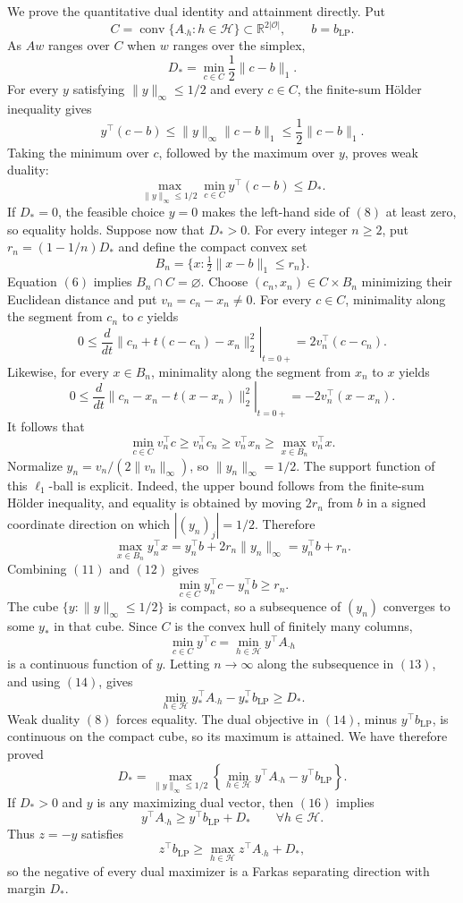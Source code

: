 We prove the quantitative dual identity and attainment directly. Put
\[
C=\operatorname{conv}\{A_{\cdot h}:h\in\mathcal H\}\subset\mathbb R^{2|\mathcal O|},\qquad b=b_{\mathrm{LP}}.
\]
As \(Aw\) ranges over \(C\) when \(w\) ranges over the simplex,
\[
D_*=\min_{c\in C}\frac12\lVert c-b\rVert_1.
\tag{6}
\]
For every \(y\) satisfying \(\lVert y\rVert_\infty\le1/2\) and every \(c\in C\), the finite-sum H\"older inequality gives
\[
y^\top(c-b)\le\lVert y\rVert_\infty\lVert c-b\rVert_1\le\frac12\lVert c-b\rVert_1.
\tag{7}
\]
Taking the minimum over \(c\), followed by the maximum over \(y\), proves weak duality:
\[
\max_{\lVert y\rVert_\infty\le1/2}\min_{c\in C}y^\top(c-b)\le D_*.
\tag{8}
\]
If \(D_*=0\), the feasible choice \(y=0\) makes the left-hand side of \((8)\) at least zero, so equality holds. Suppose now that \(D_*>0\). For every integer \(n\ge2\), put \(r_n=(1-1/n)D_*\) and define the compact convex set
\[
B_n=\{x:\tfrac12\lVert x-b\rVert_1\le r_n\}.
\]
Equation \((6)\) implies \(B_n\cap C=\varnothing\). Choose \((c_n,x_n)\in C\times B_n\) minimizing their Euclidean distance and put \(v_n=c_n-x_n\ne0\). For every \(c\in C\), minimality along the segment from \(c_n\) to \(c\) yields
\[
0\le\left.\frac{d}{dt}\lVert c_n+t(c-c_n)-x_n\rVert_2^2\right|_{t=0+}=2v_n^\top(c-c_n).
\tag{9}
\]
Likewise, for every \(x\in B_n\), minimality along the segment from \(x_n\) to \(x\) yields
\[
0\le\left.\frac{d}{dt}\lVert c_n-x_n-t(x-x_n)\rVert_2^2\right|_{t=0+}=-2v_n^\top(x-x_n).
\tag{10}
\]
It follows that
\[
\min_{c\in C}v_n^\top c\ge v_n^\top c_n\ge v_n^\top x_n\ge\max_{x\in B_n}v_n^\top x.
\tag{11}
\]
Normalize \(y_n=v_n/(2\lVert v_n\rVert_\infty)\), so \(\lVert y_n\rVert_\infty=1/2\). The support function of this \(\ell_1\)-ball is explicit. Indeed, the upper bound follows from the finite-sum H\"older inequality, and equality is obtained by moving \(2r_n\) from \(b\) in a signed coordinate direction on which \(|(y_n)_j|=1/2\). Therefore
\[
\max_{x\in B_n}y_n^\top x=y_n^\top b+2r_n\lVert y_n\rVert_\infty=y_n^\top b+r_n.
\tag{12}
\]
Combining \((11)\) and \((12)\) gives
\[
\min_{c\in C}y_n^\top c-y_n^\top b\ge r_n.
\tag{13}
\]
The cube \(\{y:\lVert y\rVert_\infty\le1/2\}\) is compact, so a subsequence of \((y_n)\) converges to some \(y_*\) in that cube. Since \(C\) is the convex hull of finitely many columns,
\[
\min_{c\in C}y^\top c=\min_{h\in\mathcal H}y^\top A_{\cdot h}
\tag{14}
\]
is a continuous function of \(y\). Letting \(n\to\infty\) along the subsequence in \((13)\), and using \((14)\), gives
\[
\min_{h\in\mathcal H}y_*^\top A_{\cdot h}-y_*^\top b_{\mathrm{LP}}\ge D_*.
\tag{15}
\]
Weak duality \((8)\) forces equality. The dual objective in \((14)\), minus \(y^\top b_{\mathrm{LP}}\), is continuous on the compact cube, so its maximum is attained. We have therefore proved
\[
D_*=\max_{\lVert y\rVert_\infty\le1/2}\left\{\min_{h\in\mathcal H}y^\top A_{\cdot h}-y^\top b_{\mathrm{LP}}\right\}.
\tag{16}
\]
If \(D_*>0\) and \(y\) is any maximizing dual vector, then \((16)\) implies
\[
y^\top A_{\cdot h}\ge y^\top b_{\mathrm{LP}}+D_*\qquad\forall h\in\mathcal H.
\tag{17}
\]
Thus \(z=-y\) satisfies
\[
z^\top b_{\mathrm{LP}}\ge\max_{h\in\mathcal H}z^\top A_{\cdot h}+D_*,
\tag{18}
\]
so the negative of every dual maximizer is a Farkas separating direction with margin \(D_*\).

